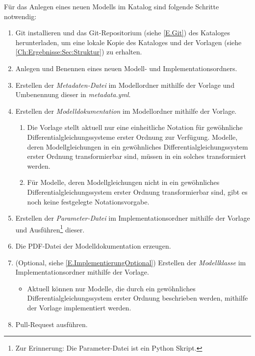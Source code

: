 Für das Anlegen eines neuen Modells im Katalog sind folgende Schritte notwendig:
\begin{enumerate}
	\item Git installieren und das Git-Repositorium (siehe \ref{E.Git}) des Kataloges herunterladen, um eine lokale Kopie des Kataloges und der Vorlagen (siehe \autoref{Ch:Ergebnisse:Sec:Struktur}) zu erhalten.
	\item Anlegen und Benennen eines neuen Modell- und Implementationsordners.
	\item Erstellen der \textit{Metadaten-Datei} im Modellordner mithilfe der Vorlage und Umbenennung dieser in \textit{metadata.yml}.
	\item Erstellen der \textit{Modelldokumentation} im Modellordner mithilfe der Vorlage.
	\begin{enumerate}[label=\textbf{Anmerkung \arabic*}:, wide=0pt, leftmargin=*]
		\item Die Vorlage stellt aktuell nur eine einheitliche Notation für gewöhnliche Differentialgleichungssysteme erster Ordnung zur Verfügung. Modelle, deren Modellgleichungen in ein gewöhnliches Differentialgleichungssystem erster Ordnung transformierbar sind, müssen in ein solches transformiert werden.
		\item Für Modelle, deren Modellgleichungen nicht in ein gewöhnliches Differentialgleichungssystem erster Ordnung transformierbar sind, gibt es noch keine festgelegte Notationsvorgabe.
	\end{enumerate}
	\item Erstellen der \textit{Parameter-Datei} im Implementationsordner mithilfe der Vorlage und Ausführen\footnote{Zur Erinnerung: Die Parameter-Datei ist ein Python Skript.} dieser.
	\item Die PDF-Datei der Modelldokumentation erzeugen.
	\item (Optional, siehe \ref{E.ImplementierungOptional}) Erstellen der \textit{Modellklasse} im Implementationsordner mithilfe der Vorlage.
	\begin{itemize}[label=\textbf{Anmerkung}:, wide=0pt, leftmargin=*]
		\item Aktuell können nur Modelle, die durch ein gewöhnliches Differentialgleichungssystem erster Ordnung beschrieben werden, mithilfe der Vorlage implementiert werden.
	\end{itemize}
	\item Pull-Request ausführen.
\end{enumerate}





